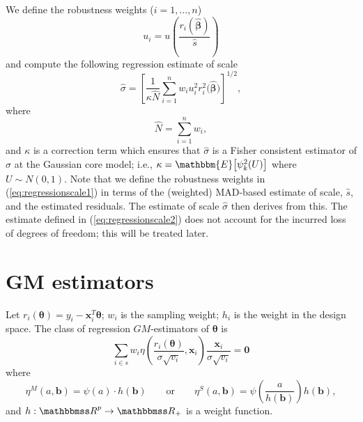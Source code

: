 \documentclass[a4paper,11pt]{scrreprt}
\theoremstyle{remark}
\begin{document}
We define the robustness weights ($i=1, \ldots, n$)
\begin{equation}\label{eq:regressionscale1}
   u_i = u\left(\frac{r_i(\widehat{\bm \beta})}{\widehat{s}}\right)
\end{equation}
\noindent and compute the following regression estimate of scale
\begin{equation}\label{eq:regressionscale2}
   \widehat{\sigma} = \left[ \frac{1}{\kappa \widehat{N}}\sum_{i=1}^n w_i u_i^2 r_i^2\big(\widehat{\bm \beta}\big) \right]^{1/2}, 
\end{equation}
\noindent where 
\begin{equation*}
   \widehat{N} = \sum_{i=1}^n w_i,
\end{equation*}
\noindent and $\kappa$ is a correction term which ensures that $\widehat{\sigma}$ is a Fisher consistent estimator of $\sigma$ at the Gaussian core model; i.e., $\kappa = \mathbbm{E}\big[\psi_k^2(U)\big]$ where $U \sim N(0,1)$. Note that we define the robustness weights in (\ref{eq:regressionscale1}) in terms of the (weighted) MAD-based estimate of scale, $\widehat{s}$, and the estimated residuals. The estimate of scale $\widehat{\sigma}$ then derives from this. The estimate defined in (\ref{eq:regressionscale2}) does not account for the incurred loss of degrees of freedom; this will be treated later. 


\chapter{GM estimators}
Let $r_i(\bm \theta) = y_i - \bm x_i^T \bm \theta$; $w_i$ is the sampling weight; $h_i$ is the weight in the design space. The class of regression $GM$-estimators of $\bm \theta$ is \citep[Chap. 6.3a][]{hampeletal1986}
\begin{equation}
   \sum_{i \in s} w_i \eta \left(\frac{r_i(\bm \theta)}{\sigma \sqrt{v_i}}, \bm x_i\right)  \frac{\bm x_i}{\sigma \sqrt{v_i}} = \bm 0
\end{equation}
\noindent where 
\begin{equation*}
   \eta^{M}(a,\bm b) = \psi(a) \cdot h(\bm b) \qquad \text{or} \qquad \eta^{S}(a,\bm b) = \psi\left(\frac{a}{h(\bm b)}\right) h(\bm b), 
\end{equation*}
\noindent and $h:\R^p \rightarrow \R_+$ is a weight function.
\end{document}
